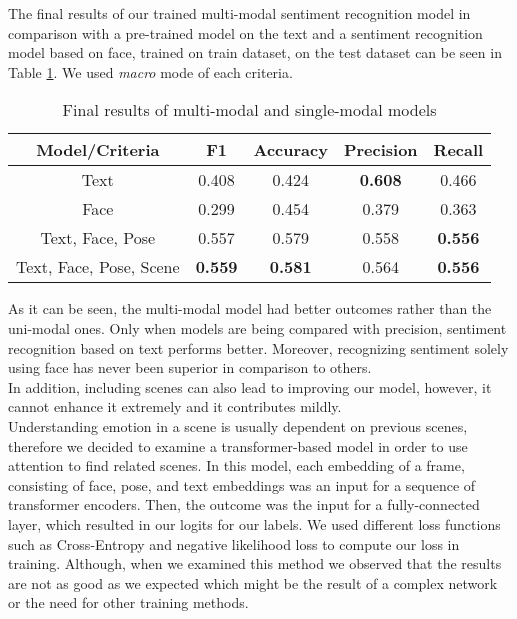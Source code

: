 The final results of our trained multi-modal sentiment recognition model in comparison with a pre-trained model on the text and a sentiment recognition model based on face, trained on train dataset, on the test dataset can be seen in Table \ref{table:results}. We used \textit{macro} mode of each criteria.

\begin{center}
	\begin{table}[h!]
		\begin{tabular}{|c|c c c c|} 
			\hline
			Model/Criteria & F1 & Accuracy & Precision & Recall \\
			\hline\hline
			Text & 0.408 & 0.424 & \textbf{0.608} & 0.466 \\
			\hline
			Face & 0.299 & 0.454 & 0.379 & 0.363 \\
			\hline
			Text, Face, Pose & 0.557 & 0.579 & 0.558 & \textbf{0.556} \\ \hline
			Text, Face, Pose, Scene & \textbf{0.559} & \textbf{0.581} & 0.564 & \textbf{0.556} \\
			\hline
		\end{tabular}
		\caption{Final results of multi-modal and single-modal models}
		\label{table:results}
	\end{table}
\end{center}

As it can be seen, the multi-modal model had better outcomes rather than the uni-modal ones. Only when models are being compared with precision, sentiment recognition based on text performs better. Moreover, recognizing sentiment solely using face has never been superior in comparison to others.\\
In addition, including scenes can also lead to improving our model, however, it cannot enhance it extremely and it contributes mildly.
\\
Understanding emotion in a scene is usually dependent on previous scenes, therefore we decided to examine a transformer-based model in order to use attention to find related scenes.
In this model, each embedding of a frame, consisting of face, pose, and text embeddings was an input for a sequence of transformer encoders. Then, the outcome was the input for a fully-connected layer, which resulted in our logits for our labels. We used different loss functions such as Cross-Entropy and negative likelihood loss to compute our loss in training. Although, when we examined this method we observed that the results are not as good as we expected which might be the result of a complex network or the need for other training methods.


